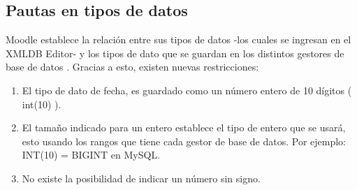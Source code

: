 \subsection{Pautas en tipos de datos}
        
         Moodle establece la relación entre sus tipos de datos -los cuales se ingresan en el XMLDB Editor- y los tipos de dato que se guardan en los distintos gestores de base de datos \cite{moodleTiposBD}.  Gracias a esto, existen nuevas restricciones:
        \begin{enumerate}
            \item El tipo de dato de fecha, es guardado como un número entero de 10 dígitos ( int(10) ).
            \item El tamaño indicado para un entero establece el tipo de entero que se usará, esto usando los rangos que tiene cada gestor de base de datos. Por ejemplo: INT(10) = BIGINT en MySQL.
            \item No existe la posibilidad de indicar un número sin signo.
        \end{enumerate}
        
\clearpage        

